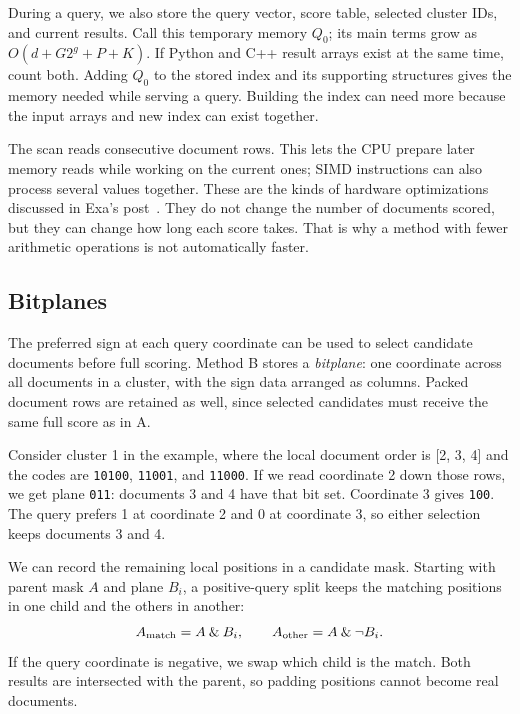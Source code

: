 During a query, we also store the query vector, score table, selected cluster IDs, and current
results. Call this temporary memory $Q_0$; its main terms grow as $O(d+G2^g+P+K)$. If Python
and C++ result arrays exist at the same time, count both. Adding $Q_0$ to the stored index
and its supporting structures gives the memory needed while serving a query. Building the
index can need more because the input arrays and new index can exist together.

The scan reads consecutive document rows. This lets the CPU prepare later memory reads while
working on the current ones; SIMD instructions can also process several values together.
These are the kinds of hardware optimizations discussed in Exa's post~\cite{exa}. They do not
change the number of documents scored, but they can change how long each score takes.
That is why a method with fewer arithmetic operations is not automatically faster.

\subsection{Bitplanes}
The preferred sign at each query coordinate can be used to select candidate documents before
full scoring. Method B stores a \emph{bitplane}: one coordinate across all documents in a
cluster, with the sign data arranged as columns. Packed document rows are retained as well,
since selected candidates must receive the same full score as in A.

Consider cluster 1 in the example, where the local document order is [2, 3, 4] and the codes
are \texttt{10100}, \texttt{11001}, and \texttt{11000}. If we read coordinate 2 down those
rows, we get plane \texttt{011}: documents 3 and 4 have that bit set. Coordinate 3 gives
\texttt{100}. The query prefers 1 at coordinate 2 and 0 at coordinate 3, so either selection
keeps documents 3 and 4.

We can record the remaining local positions in a candidate mask. Starting with parent mask
$A$ and plane $B_i$, a positive-query split keeps the matching positions in one child and the
others in another:
\[
A_{\rm match}=A\mathbin{\&}B_i,
\qquad A_{\rm other}=A\mathbin{\&}\neg B_i.
\]
If the query coordinate is negative, we swap which child is the match. Both results are
intersected with the parent, so padding positions cannot become real documents.


